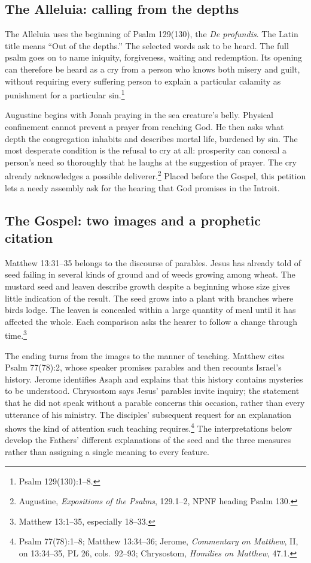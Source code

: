 \subsection{The Alleluia: calling from the depths}

The Alleluia uses the beginning of Psalm 129(130), the \textit{De profundis}. The Latin title means ``Out of the depths.'' The selected words ask to be heard. The full psalm goes on to name iniquity, forgiveness, waiting and redemption. Its opening can therefore be heard as a cry from a person who knows both misery and guilt, without requiring every suffering person to explain a particular calamity as punishment for a particular sin.\footnote{Psalm 129(130):1--8.}

Augustine begins with Jonah praying in the sea creature's belly. Physical confinement cannot prevent a prayer from reaching God. He then asks what depth the congregation inhabits and describes mortal life, burdened by sin. The most desperate condition is the refusal to cry at all: prosperity can conceal a person's need so thoroughly that he laughs at the suggestion of prayer. The cry already acknowledges a possible deliverer.\footnote{Augustine, \textit{Expositions of the Psalms}, 129.1--2, NPNF heading Psalm 130.} Placed before the Gospel, this petition lets a needy assembly ask for the hearing that God promises in the Introit.

\subsection{The Gospel: two images and a prophetic citation}

Matthew 13:31--35 belongs to the discourse of parables. Jesus has already told of seed failing in several kinds of ground and of weeds growing among wheat. The mustard seed and leaven describe growth despite a beginning whose size gives little indication of the result. The seed grows into a plant with branches where birds lodge. The leaven is concealed within a large quantity of meal until it has affected the whole. Each comparison asks the hearer to follow a change through time.\footnote{Matthew 13:1--35, especially 18--33.}

The ending turns from the images to the manner of teaching. Matthew cites Psalm 77(78):2, whose speaker promises parables and then recounts Israel's history. Jerome identifies Asaph and explains that this history contains mysteries to be understood. Chrysostom says Jesus' parables invite inquiry; the statement that he did not speak without a parable concerns this occasion, rather than every utterance of his ministry. The disciples' subsequent request for an explanation shows the kind of attention such teaching requires.\footnote{Psalm 77(78):1--8; Matthew 13:34--36; Jerome, \textit{Commentary on Matthew}, II, on 13:34--35, PL 26, cols.~92--93; Chrysostom, \textit{Homilies on Matthew}, 47.1.} The interpretations below develop the Fathers' different explanations of the seed and the three measures rather than assigning a single meaning to every feature.

